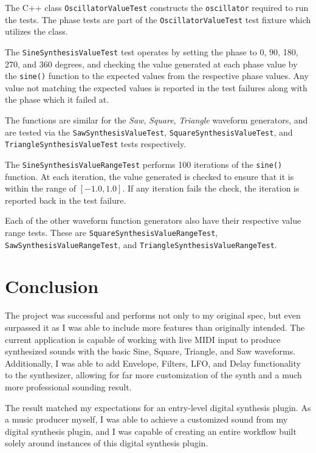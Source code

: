 \documentclass[a4paper,12pt]{report}
\begin{document}
The C++ class \texttt{OscillatorValueTest} constructs the \texttt{oscillator} required to run the tests. The phase tests are part of the \texttt{OscillatorValueTest} test fixture which utilizes the class.

The \texttt{SineSynthesisValueTest} test operates by setting the phase to 0, 90, 180, 270, and 360 degrees, and checking the value generated at each phase value by the \texttt{sine()} function to the expected values from the respective phase values. Any value not matching the expected values is reported in the test failures along with the phase which it failed at.

The functions are similar for the \emph{Saw}, \emph{Square}, \emph{Triangle} waveform generators, and are tested via the \texttt{SawSynthesisValueTest}, \texttt{SquareSynthesisValueTest}, and \texttt{TriangleSynthesisValueTest} tests respectively.

The \texttt{SineSynthesisValueRangeTest} performs 100 iterations of the \texttt{sine()} function. At each iteration, the value generated is checked to ensure that it is within the range of $[-1.0,1.0]$. If any iteration fails the check, the iteration is reported back in the test failure.

Each of the other waveform function generators also have their respective value range tests. These are \texttt{SquareSynthesisValueRangeTest}, \texttt{SawSynthesisValueRangeTest}, and \texttt{TriangleSynthesisValueRangeTest}.

\chapter{Conclusion}
\label{chapter:results}
The project was successful and performs not only to my original spec, but even surpassed it as I was able to include more features than originally intended. The current application is capable of working with live MIDI input to produce synthesized sounds with the basic Sine, Square, Triangle, and Saw waveforms. Additionally, I was able to add Envelope, Filters, LFO, and Delay functionality to the synthesizer, allowing for far more customization of the synth and a much more professional sounding result. 

The result matched my expectations for an entry-level digital synthesis plugin. As a music producer myself, I was able to achieve a customized sound from my digital synthesis plugin, and I was capable of creating an entire workflow built solely around instances of this digital synthesis plugin.
\end{document}
